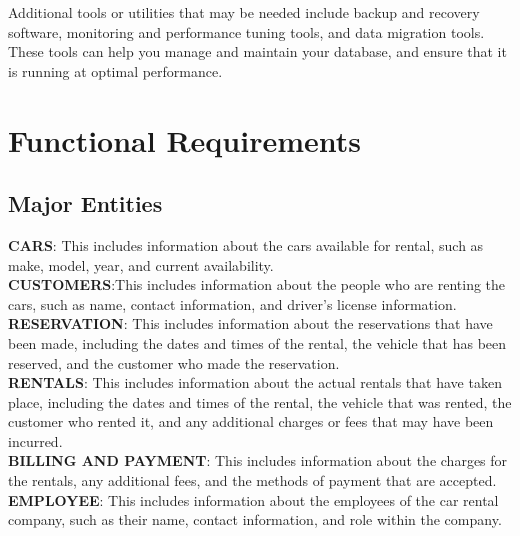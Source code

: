 Additional tools or utilities that may be needed include backup and recovery software, monitoring and performance tuning tools, and data migration tools. These tools can help you manage and maintain your database, and ensure that it is running at optimal performance.
\section{Functional Requirements}
\subsection{Major Entities}
\textbf{CARS}: This includes information about the cars available for rental, such as make, model, year, and current availability.\\
\textbf{CUSTOMERS}:This includes information about the people who are renting the cars, such as name, contact information, and driver's license information.\\
\textbf{RESERVATION}: This includes information about the reservations that have been made, including the dates and times of the rental, the vehicle that has been reserved, and the customer who made the reservation.\\
\textbf{RENTALS}: This includes information about the actual rentals that have taken place, including the dates and times of the rental, the vehicle that was rented, the customer who rented it, and any additional charges or fees that may have been incurred.\\
\textbf{BILLING AND PAYMENT}: This includes information about the charges for the rentals, any additional fees, and the methods of payment that are accepted.\\
\textbf{EMPLOYEE}: This includes information about the employees of the car rental company, such as their name, contact information, and role within the company.\\

